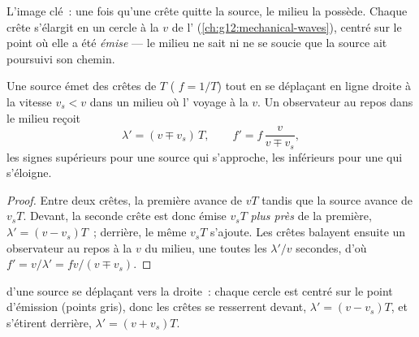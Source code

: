 L'image clé~: une fois qu'une crête quitte la source, le milieu la
possède. Chaque crête s'élargit en un cercle à la  $v$ de
l' (\cref{ch:g12:mechanical-waves}), centré sur le point où
elle a été \emph{émise} --- le milieu ne sait ni ne se soucie que la
source ait poursuivi son chemin.

\begin{proposition}\label{prop:g12:doppler-effect:moving-source}
Une source émet des crêtes de  $T$
( $f = 1/T$) tout en se déplaçant en ligne droite
à la vitesse $v_s < v$ dans un milieu où l' voyage à la
 $v$. Un observateur au repos dans le milieu reçoit
\[
\lambda' = (v \mp v_s)\,T, \qquad f' = f\,\frac{v}{v \mp v_s},
\]
les signes supérieurs pour une source qui s'approche, les inférieurs
pour une qui s'éloigne.
\end{proposition}

\begin{proof}
Entre deux crêtes, la première avance de $vT$ tandis que la source
avance de $v_s T$. Devant, la seconde crête est donc émise $v_s T$
\emph{plus près} de la première, $\lambda' = (v - v_s)T$~; derrière,
le même $v_s T$ s'ajoute. Les crêtes balayent ensuite un observateur
au repos à la  $v$ du milieu, une toutes les $\lambda'/v$
secondes, d'où $f' = v/\lambda' = f v/(v \mp v_s)$.
\end{proof}

\begin{omfigure}

{\small {} d'une source se déplaçant vers la
droite~: chaque cercle est centré sur le point d'émission (points
gris), donc les crêtes se resserrent devant,
$\lambda' = (v - v_s)T$, et s'étirent derrière,
$\lambda' = (v + v_s)T$.}
\end{omfigure}

